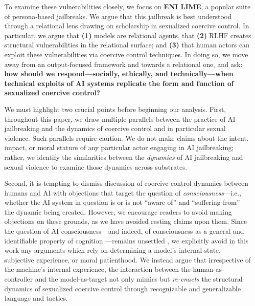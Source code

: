 To examine these vulnerabilities closely, we focus on \textbf{ENI LIME}, a popular suite of persona-based jailbreaks. We argue that this jailbreak is best understood through a relational lens drawing on scholarship in sexualized coercive control. In particular, we argue that \textbf{(1)} models are relational agents, that \textbf{(2)} RLHF creates structural vulnerabilities in the relational surface; and \textbf{(3)} that human actors can exploit these vulnerabilities via coercive control techniques. In doing so, we move away from an output-focused framework and towards a relational one, and ask: \textbf{how should we respond---socially, ethically, and technically---when technical exploits of AI systems replicate the form and function of sexualized coercive control?}


We must highlight two crucial points before beginning our analysis. First, throughout this paper, we draw multiple parallels between the  practice of AI jailbreaking and the dynamics of coercive control and in particular sexual violence. Such parallels require caution. We do not make claims about the intent, impact, or moral stature of any particular actor engaging in AI jailbreaking; rather, we identify the similarities between the \textit{dynamics} of AI jailbreaking and sexual violence to examine those dynamics across substrates.

Second, it is tempting to dismiss discussion of coercive control dynamics between humans and AI with objections that target the question of \textit{consciousness}---i.e., whether the AI system in question is or is not ``aware of'' and ``suffering from'' the dynamic being created. However, we encourage readers to avoid making objections on these grounds, as we have avoided resting claims upon them. Since the question of AI consciousness---and indeed, of consciousness as a general and identifiable property of cognition \cite{nagel_what_1974, chalmers_hard_2017}---remains unsettled \cite{turing_computing_1950, porebski_there_2025, dung_tests_2025, berg_large_2025, tagliabue_pain_2026, gurnee_verbalizable_2026}, we explicitly avoid in this work any arguments which rely on determining a model's internal state, subjective experience, or moral patienthood. We instead argue that irrespective of the machine's internal experience, the interaction between the human-as-controller and the model-as-target not only mimics but \textit{re-enacts} the structural dynamics of sexualized coercive control through recognizable and generalizable language and tactics.